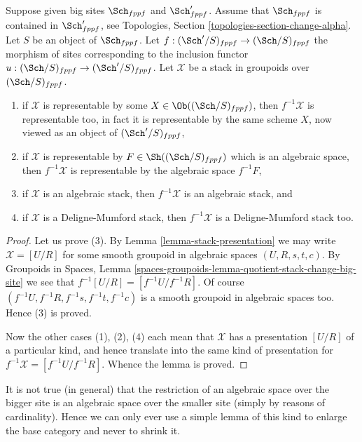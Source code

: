 \begin{lemma}
\label{lemma-change-big-site}
Suppose given big sites $\Sch_{fppf}$ and $\Sch'_{fppf}$.
Assume that $\Sch_{fppf}$ is contained in $\Sch'_{fppf}$,
see Topologies, Section \ref{topologies-section-change-alpha}.
Let $S$ be an object of $\Sch_{fppf}$.
Let $f : (\Sch'/S)_{fppf} \to (\Sch/S)_{fppf}$ the morphism
of sites corresponding to the inclusion functor
$u : (\Sch/S)_{fppf} \to (\Sch'/S)_{fppf}$.
Let $\mathcal{X}$ be a stack in groupoids over $(\Sch/S)_{fppf}$.
\begin{enumerate}
\item if $\mathcal{X}$ is representable by some
$X \in \Ob((\Sch/S)_{fppf})$, then
$f^{-1}\mathcal{X}$ is representable too, in fact it is representable by the
same scheme $X$, now viewed as an object of $(\Sch'/S)_{fppf}$,
\item if $\mathcal{X}$ is representable by
$F \in \Sh((\Sch/S)_{fppf})$ which is
an algebraic space, then $f^{-1}\mathcal{X}$ is representable
by the algebraic space $f^{-1}F$,
\item if $\mathcal{X}$ is an algebraic stack, then $f^{-1}\mathcal{X}$
is an algebraic stack, and
\item if $\mathcal{X}$ is a Deligne-Mumford stack, then $f^{-1}\mathcal{X}$
is a Deligne-Mumford stack too.
\end{enumerate}
\end{lemma}

\begin{proof}
Let us prove (3). By
Lemma \ref{lemma-stack-presentation}
we may write $\mathcal{X} = [U/R]$ for some smooth
groupoid in algebraic spaces $(U, R, s, t, c)$. By
Groupoids in Spaces,
Lemma \ref{spaces-groupoids-lemma-quotient-stack-change-big-site}
we see that $f^{-1}[U/R] = [f^{-1}U/f^{-1}R]$.
Of course $(f^{-1}U, f^{-1}R, f^{-1}s, f^{-1}t, f^{-1}c)$
is a smooth groupoid in algebraic spaces too. Hence (3) is proved.

\medskip\noindent
Now the other cases (1), (2), (4) each mean that $\mathcal{X}$ has
a presentation $[U/R]$ of a particular kind, and hence translate into the
same kind of presentation for $f^{-1}\mathcal{X} = [f^{-1}U/f^{-1}R]$.
Whence the lemma is proved.
\end{proof}

\noindent
It is not true (in general) that the restriction of an algebraic space
over the bigger site is an algebraic space over the smaller site (simply
by reasons of cardinality). Hence we can only ever use a simple lemma of this
kind to enlarge the base category and never to shrink it.

